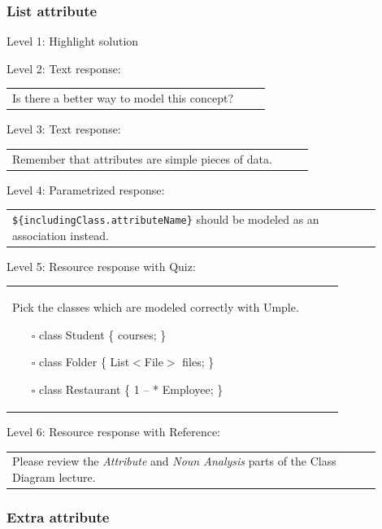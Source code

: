 \subsubsection{List attribute}

\noindent Level 1: Highlight solution  \medskip

\noindent Level 2: Text response: \medskip

\begin{tabular}{|p{0.9\linewidth}}
Is there a better way to model this concept?
\end{tabular} \medskip

\noindent Level 3: Text response: \medskip

\begin{tabular}{|p{0.9\linewidth}}
Remember that attributes are simple pieces of data.
\end{tabular} \medskip

\noindent Level 4: Parametrized response: \medskip

\begin{tabular}{|p{0.9\linewidth}}
\verb|${includingClass.attributeName}| should be modeled as an association instead.
\end{tabular} \medskip

\noindent Level 5: Resource response with Quiz: \medskip

\begin{tabular}{|p{0.9\linewidth}}
Pick the classes which are modeled correctly with Umple.

\begin{itemize}
    \item[$\square$] class Student \{ courses; \}
    \item[$\square$] class Folder \{ List$<$File$>$ files; \}
    \item[$\square$] class Restaurant \{ 1 -- * Employee; \}
\end{itemize}

\end{tabular} \medskip

\noindent Level 6: Resource response with Reference: \medskip

\begin{tabular}{|p{0.9\linewidth}}
Please review the \textit{Attribute} and \textit{Noun Analysis} parts of the Class Diagram lecture.
\end{tabular} \medskip


\subsubsection{Extra attribute}

